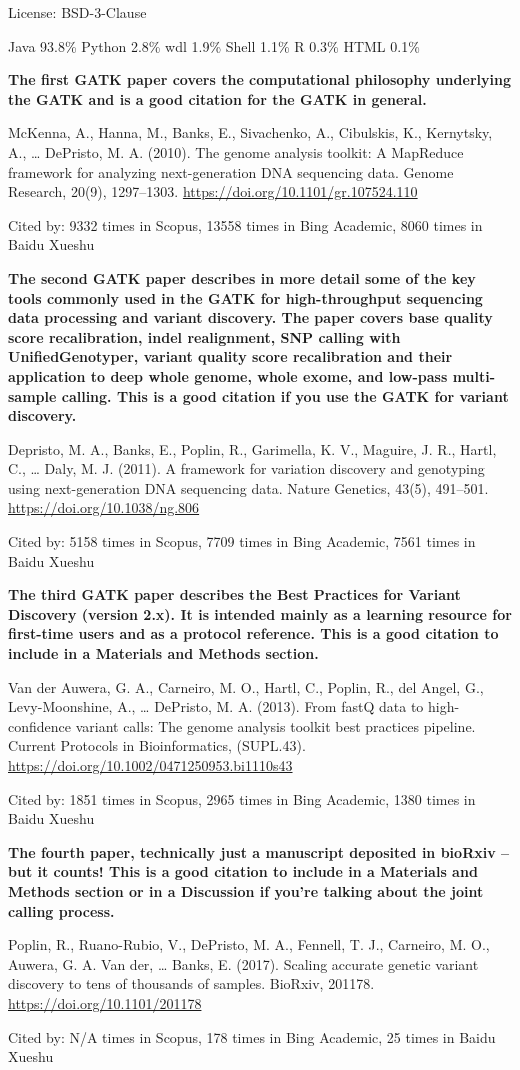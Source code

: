 \documentclass[]{article}
\newcommand{\cb}[3]{\par Cited by: {\color{blue}\Huge #1} times in Scopus, {\color{blue}\Huge #2} times in Bing Academic, {\color{blue}\Huge #3} times in Baidu Xueshu}
\begin{document}
License: BSD-3-Clause

Java 93.8\% Python 2.8\% wdl 1.9\% Shell 1.1\% R 0.3\% HTML 0.1\%

\textbf{The first GATK paper covers the computational philosophy underlying the GATK and is a good citation for the GATK in general.}

McKenna, A., Hanna, M., Banks, E., Sivachenko, A., Cibulskis, K., Kernytsky, A., … DePristo, M. A. (2010). The genome analysis toolkit: A MapReduce framework for analyzing next-generation DNA sequencing data. Genome Research, 20(9), 1297–1303. \url{https://doi.org/10.1101/gr.107524.110}\cb{9332}{13558}{8060}

\textbf{The second GATK paper describes in more detail some of the key tools commonly used in the GATK for high-throughput sequencing data processing and variant discovery. The paper covers base quality score recalibration, indel realignment, SNP calling with UnifiedGenotyper, variant quality score recalibration and their application to deep whole genome, whole exome, and low-pass multi-sample calling. This is a good citation if you use the GATK for variant discovery.}

Depristo, M. A., Banks, E., Poplin, R., Garimella, K. V., Maguire, J. R., Hartl, C., … Daly, M. J. (2011). A framework for variation discovery and genotyping using next-generation DNA sequencing data. Nature Genetics, 43(5), 491–501. \url{https://doi.org/10.1038/ng.806}\cb{5158}{7709}{7561}

\textbf{The third GATK paper describes the Best Practices for Variant Discovery (version 2.x). It is intended mainly as a learning resource for first-time users and as a protocol reference. This is a good citation to include in a Materials and Methods section.}

Van der Auwera, G. A., Carneiro, M. O., Hartl, C., Poplin, R., del Angel, G., Levy-Moonshine, A., … DePristo, M. A. (2013). From fastQ data to high-confidence variant calls: The genome analysis toolkit best practices pipeline. Current Protocols in Bioinformatics, (SUPL.43). \url{https://doi.org/10.1002/0471250953.bi1110s43}\cb{1851}{2965}{1380}

\textbf{The fourth paper, technically just a manuscript deposited in bioRxiv -- but it counts! This is a good citation to include in a Materials and Methods section or in a Discussion if you're talking about the joint calling process.}

Poplin, R., Ruano-Rubio, V., DePristo, M. A., Fennell, T. J., Carneiro, M. O., Auwera, G. A. Van der, … Banks, E. (2017). Scaling accurate genetic variant discovery to tens of thousands of samples. BioRxiv, 201178. \url{https://doi.org/10.1101/201178}\cb{N/A}{178}{25}
\end{document}

